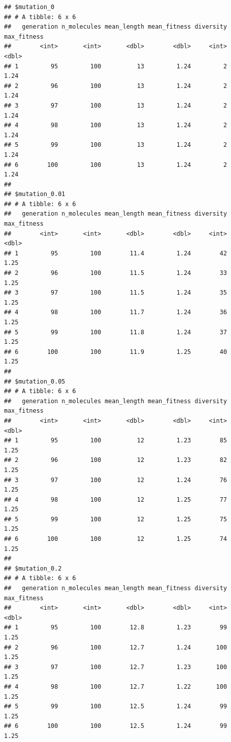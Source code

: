 \documentclass[
  oneside,
  openany]{book}
\begin{document}
\begin{verbatim}
## $mutation_0
## # A tibble: 6 x 6
##   generation n_molecules mean_length mean_fitness diversity max_fitness
##        <int>       <int>       <dbl>        <dbl>     <int>       <dbl>
## 1         95         100          13         1.24         2        1.24
## 2         96         100          13         1.24         2        1.24
## 3         97         100          13         1.24         2        1.24
## 4         98         100          13         1.24         2        1.24
## 5         99         100          13         1.24         2        1.24
## 6        100         100          13         1.24         2        1.24
## 
## $mutation_0.01
## # A tibble: 6 x 6
##   generation n_molecules mean_length mean_fitness diversity max_fitness
##        <int>       <int>       <dbl>        <dbl>     <int>       <dbl>
## 1         95         100        11.4         1.24        42        1.25
## 2         96         100        11.5         1.24        33        1.25
## 3         97         100        11.5         1.24        35        1.25
## 4         98         100        11.7         1.24        36        1.25
## 5         99         100        11.8         1.24        37        1.25
## 6        100         100        11.9         1.25        40        1.25
## 
## $mutation_0.05
## # A tibble: 6 x 6
##   generation n_molecules mean_length mean_fitness diversity max_fitness
##        <int>       <int>       <dbl>        <dbl>     <int>       <dbl>
## 1         95         100          12         1.23        85        1.25
## 2         96         100          12         1.23        82        1.25
## 3         97         100          12         1.24        76        1.25
## 4         98         100          12         1.25        77        1.25
## 5         99         100          12         1.25        75        1.25
## 6        100         100          12         1.25        74        1.25
## 
## $mutation_0.2
## # A tibble: 6 x 6
##   generation n_molecules mean_length mean_fitness diversity max_fitness
##        <int>       <int>       <dbl>        <dbl>     <int>       <dbl>
## 1         95         100        12.8         1.23        99        1.25
## 2         96         100        12.7         1.24       100        1.25
## 3         97         100        12.7         1.23       100        1.25
## 4         98         100        12.7         1.22       100        1.25
## 5         99         100        12.5         1.24        99        1.25
## 6        100         100        12.5         1.24        99        1.25
\end{verbatim}
\end{document}
